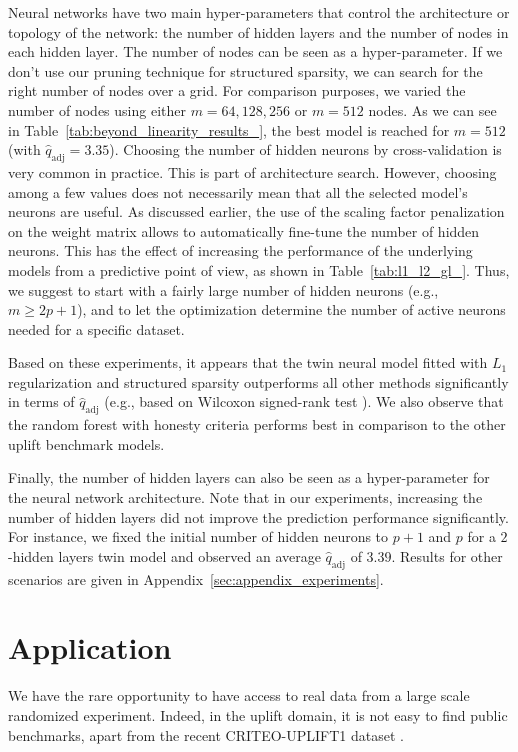 \documentclass{article}
\def\qadj{\hat{q}_{\mathrm{adj}}}
\begin{document}
Neural networks have two main hyper-parameters that control the architecture or topology of the network: the number of hidden layers and the number of nodes in each hidden layer. The number of nodes can be seen as a hyper-parameter. If we don't use our pruning technique for structured sparsity, we can search for the right number of nodes over a grid. For comparison purposes, we varied the number of nodes using either $m=64, 128, 256$ or $m=512$ nodes. As we can see in Table~\ref{tab:beyond_linearity_results_}, the best model is reached for $m = 512$ (with $\qadj=3.35$). Choosing the number of hidden neurons by cross-validation is very common in practice. This is part of architecture search. However, choosing among a few values does not necessarily mean that all the selected model's neurons are useful. As discussed earlier, the use of the scaling factor penalization on the weight matrix allows to automatically fine-tune the number of hidden neurons. This has the effect of increasing the performance of the underlying models from a predictive point of view, as shown in Table~\ref{tab:l1_l2_gl_}. Thus, we suggest to start with a fairly large number of hidden neurons (e.g., $m \geq 2p +1$), and to let the optimization determine the number of active neurons needed for a specific dataset. 

Based on these experiments, it appears that the twin neural model fitted with $L_1$ regularization and structured sparsity outperforms all other methods significantly in terms of $\qadj$ (e.g., based on  Wilcoxon signed-rank test \citep{wilcoxon1992individual}). We also observe that the random forest with honesty criteria performs best in comparison to the other uplift benchmark models. 

Finally, the number of hidden layers can also be seen as a hyper-parameter for the neural network architecture. Note that in our experiments, increasing the number of hidden layers did not improve the prediction performance significantly. For instance, we fixed the initial number of hidden neurons to $p+1$ and $p$ for a $2$-hidden layers twin model and observed an average $\qadj$ of $3.39$. Results for other scenarios are given in Appendix~\ref{sec:appendix_experiments}. 


\section{Application}

We have the rare opportunity to have access to real data from a large scale randomized experiment. Indeed, in the uplift domain, it is not easy to find public benchmarks, apart from the recent CRITEO-UPLIFT1 dataset \citep{Diemert2018}.
\end{document}
